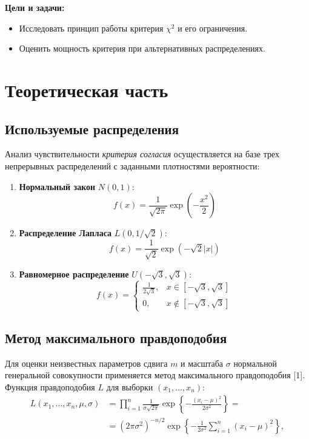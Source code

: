 \documentclass[a4paper, 14pt]{extarticle}
\begin{document}
\textbf{Цели и задачи:}
\begin{itemize}
    \item Исследовать принцип работы критерия $\chi^2$ и его ограничения.
    \item  Оценить мощность критерия при альтернативных распределениях.
\end{itemize}

\section{Теоретическая часть}

\subsection{Используемые распределения}

Анализ чувствительности \textit{критерия согласия} осуществляется на базе трех непрерывных распределений с заданными плотностями вероятности:

\begin{enumerate}
    \item \textbf{Нормальный закон} $N(0, 1)$:
        \begin{equation*}
            f(x) = \frac{1}{\sqrt{2\pi}} \exp\left(-\frac{x^2}{2}\right)
        \end{equation*}
    \item \textbf{Распределение Лапласа} $L(0, 1/\sqrt{2})$:
        \begin{equation*}
            f(x) = \frac{1}{\sqrt{2}} \exp\left(-\sqrt{2}|x|\right)
        \end{equation*}
    \item \textbf{Равномерное распределение} $U(-\sqrt{3}, \sqrt{3})$:
        \begin{equation*}
            f(x) = \begin{cases} 
            \frac{1}{2\sqrt{3}}, & x \in [-\sqrt{3}, \sqrt{3}] \\ 
            0, & x \notin [-\sqrt{3}, \sqrt{3}] 
            \end{cases}
        \end{equation*}
\end{enumerate}

\subsection{Метод максимального правдоподобия}

Для оценки неизвестных параметров сдвига $m$ и масштаба $\sigma$ нормальной генеральной совокупности применяется метод максимального правдоподобия [1]. Функция правдоподобия $L$ для выборки $(x_1, \dots, x_n)$:
\begin{equation*}
\begin{aligned}
L(x_1, \dots, x_n, \mu, \sigma) &= \prod_{i=1}^{n} \frac{1}{\sigma \sqrt{2\pi}} \exp \left\{ -\frac{(x_i - \mu)^2}{2\sigma^2} \right\} = \\
&= (2\pi\sigma^2)^{-n/2} \exp \left\{ -\frac{1}{2\sigma^2} \sum_{i=1}^{n} (x_i - \mu)^2 \right\},
\end{aligned}
\end{equation*}
\end{document}

